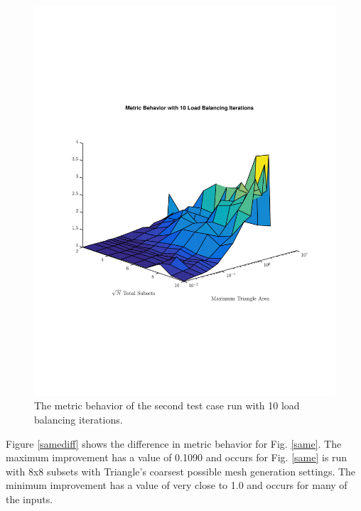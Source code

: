 \documentclass{anstrans}
\begin{document}
\begin{figure}[H]
\centering
\includegraphics[scale=0.50, trim = 2cm 6cm 2cm 7cm,clip]{figures/SameIter.pdf}
\caption{The metric behavior of the second test case run with 10 load balancing iterations.}
\label{sameiter}
\end{figure}

Figure \ref{samediff} shows the difference in metric behavior for Fig. \ref{same}. The maximum improvement has a value of 0.1090 and occurs for Fig. \ref{same} is run with 8x8 subsets with Triangle's coarsest possible mesh generation settings. The minimum improvement has a value of very close to 1.0 and occurs for many of the inputs. 
\end{document}

